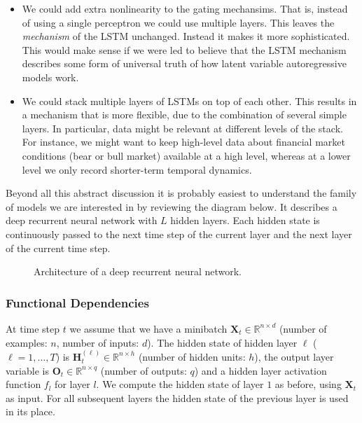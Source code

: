 \begin{itemize}
    \item We could add extra nonlinearity to the gating mechansims. That is, instead of using a single perceptron we could use multiple layers. This leaves the \textit{mechanism} of the LSTM unchanged. Instead it makes it more sophisticated. This would make sense if we were led to believe that the LSTM mechanism describes some form of universal truth of how latent variable autoregressive models work.
    \item We could stack multiple layers of LSTMs on top of each other. This results in a mechanism that is more flexible, due to the combination of several simple layers. In particular, data might be relevant at different levels of the stack. For instance, we might want to keep high-level data about financial market conditions (bear or bull market) available at a high level, whereas at a lower level we only record shorter-term temporal dynamics.
\end{itemize}

Beyond all this abstract discussion it is probably easiest to understand the family of models we are interested in by reviewing the diagram below. It describes a deep recurrent neural network with $L$ hidden layers. Each hidden state is continuously passed to the next time step of the current layer and the next layer of the current time step.

\begin{figure}[hpt]
	\centering
	
	\caption{Architecture of a deep recurrent neural network.}
	\label{fig:deep-rnn}
\end{figure}

\subsubsection{Functional Dependencies}

At time step $t$ we assume that we have a minibatch $\mathbf{X}_t \in \mathbb{R}^{n \times d}$ (number of examples: $n$, number of inputs: $d$). The hidden state of hidden layer $\ell$ ($\ell=1,\ldots,T$) is $\mathbf{H}_t^{(\ell)}  \in \mathbb{R}^{n \times h}$ (number of hidden units: $h$), the output layer variable is $\mathbf{O}_t \in \mathbb{R}^{n \times q}$ (number of outputs: $q$) and a hidden layer activation function $f_l$ for layer $l$. We compute the hidden state of layer $1$ as before, using $\mathbf{X}_t$ as input. For all subsequent layers the hidden state of the previous layer is used in its place.


